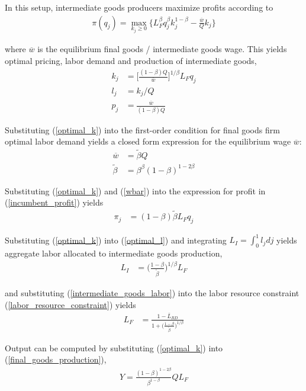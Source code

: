 \documentclass[12pt,english]{article}
\theoremstyle{remark}
\begin{document}
In this setup, intermediate goods producers maximize profits according to
\begin{align}
\pi(q_j) = \max_{k_j \ge 0} \Big\{ L_F^{\beta} q_j^{\beta} k_j^{1-\beta} - \frac{\overline{w}}{Q} k_j \Big\} \label{incumbent_profit}
\end{align}

where $\overline{w}$ is the equilibrium final goods / intermediate goods wage.
This yields optimal pricing, labor demand and production of intermediate goods,
\begin{align}
k_j &= \Big[ \frac{(1-\beta) Q}{\overline{w}} \Big]^{1/\beta}L_F q_j  \label{optimal_k}\\
l_j &= k_j / Q \label{optimal_l}\\
p_j &= \frac{\overline{w}}{(1-\beta) Q} \label{optimal_p}
\end{align}

Substituting (\ref{optimal_k}) into the first-order condition for final goods firm optimal labor demand yields a closed form expression for the equilibrium wage $\overline{w}$:
\begin{align}
\overline{w} &= \tilde{\beta} Q \label{wbar} \\
\tilde{\beta} &= \beta^{\beta} (1-\beta)^{1-2\beta} \label{def_cbeta}
\end{align}

Substituting (\ref{optimal_k}) and (\ref{wbar}) into the expression for profit in (\ref{incumbent_profit}) yields
\begin{align}
\pi_j &= (1-\beta) \tilde{\beta} L_F q_j \label{profits_eq}
\end{align}

Substituting (\ref{optimal_k}) into (\ref{optimal_l}) and integrating $L_I = \int_0^1 l_j dj$ yields aggregate labor allocated to intermediate goods production,
\begin{align}
L_I &= \Big( \frac{1-\beta}{\tilde{\beta}} \Big)^{1 / \beta} L_F \label{intermediate_goods_labor}
\end{align}

and substituting (\ref{intermediate_goods_labor}) into the labor resource constraint (\ref{labor_resource_constraint}) yields
\begin{align}
L_F &= \frac{1 - \bar{L}_{RD}}{1 + \Big(\frac{1-\beta}{\tilde{\beta}}\Big)^{1/\beta}}
\end{align}

Output can be computed by substituting (\ref{optimal_k}) into (\ref{final_goods_production}), 
\begin{align}
Y = \frac{(1-\beta)^{1-2\beta}}{\beta^{1-\beta}} Q L_F \label{flow_output}
\end{align}
\end{document}
